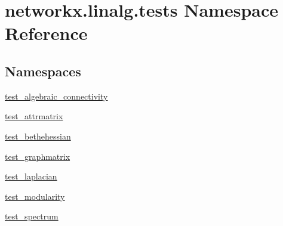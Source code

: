 \hypertarget{namespacenetworkx_1_1linalg_1_1tests}{}\section{networkx.\+linalg.\+tests Namespace Reference}
\label{namespacenetworkx_1_1linalg_1_1tests}
\subsection*{Namespaces}
\begin{DoxyCompactItemize}
\item 
 \hyperlink{namespacenetworkx_1_1linalg_1_1tests_1_1test__algebraic__connectivity}{test\+\_\+algebraic\+\_\+connectivity}
\item 
 \hyperlink{namespacenetworkx_1_1linalg_1_1tests_1_1test__attrmatrix}{test\+\_\+attrmatrix}
\item 
 \hyperlink{namespacenetworkx_1_1linalg_1_1tests_1_1test__bethehessian}{test\+\_\+bethehessian}
\item 
 \hyperlink{namespacenetworkx_1_1linalg_1_1tests_1_1test__graphmatrix}{test\+\_\+graphmatrix}
\item 
 \hyperlink{namespacenetworkx_1_1linalg_1_1tests_1_1test__laplacian}{test\+\_\+laplacian}
\item 
 \hyperlink{namespacenetworkx_1_1linalg_1_1tests_1_1test__modularity}{test\+\_\+modularity}
\item 
 \hyperlink{namespacenetworkx_1_1linalg_1_1tests_1_1test__spectrum}{test\+\_\+spectrum}
\end{DoxyCompactItemize}
